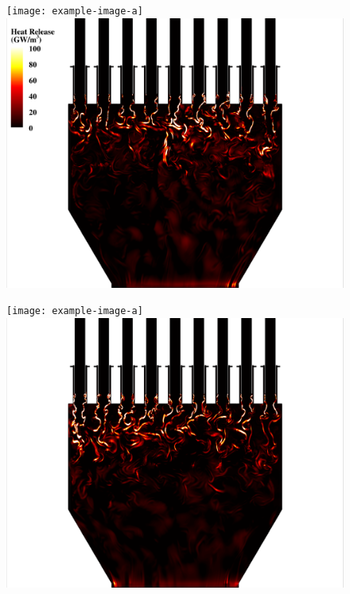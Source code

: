 \begin{figure}
	\begin{minipage}{0.49\linewidth}
		\ifdefined\DRAFT
			\texttt{[image: example-image-a]}
		\else
			\includegraphics[width=0.99\linewidth,trim={0.5em 0em 6cm 0em},clip]{Chapters/NineElement/Images/example_snaps/example_heat_z.png}
		\fi
	\end{minipage}
	\begin{minipage}{0.49\linewidth}
		\ifdefined\DRAFT
			\texttt{[image: example-image-a]}
		\else
			\includegraphics[width=0.99\linewidth,trim={6cm 0em 0.5em 0em},clip]{Chapters/NineElement/Images/example_snaps/example_heat_z_216000.png}
		\fi
	\end{minipage}


\end{figure}
